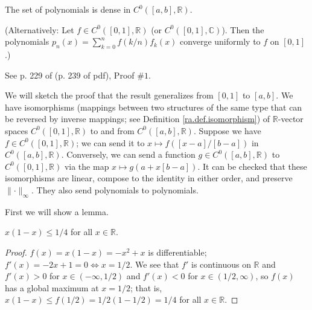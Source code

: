 \begin{theorem}\label{ra.thm.weierstrass.approx}

The set of polynomials is dense in \(C^0([a,b], \mathbb{R})\).

(Alternatively: Let \(f \in C^0([0,1], \mathbb{R})\) (or \(C^0([0,1], \mathbb{C})\)). Then the polynomials \(p_n(x) = \sum_{k=0}^n f(k/n) f_k(x)\) converge uniformly to \(f\) on \([0,1]\).)

\end{theorem}

\begin{remark}

See p. 229 of \citet{pugh2015real} (p. 239 of pdf), Proof \(\# 1\).

We will sketch the proof that the result generalizes from \([0,1]\) to \([a,b]\). We have isomorphisms (mappings between two structures of the same type that can be reversed by inverse mappings; see Definition \ref{ra.def.isomorphism}) of \(\mathbb{R}\)-vector spaces \(C^0([0,1],\mathbb{R}) \) to and from \(C^0([a,b],\mathbb{R})\). Suppose we have \(f \in C^0([0,1],\mathbb{R})\); we can send it to \(x \mapsto f([x-a]/[b-a])\) in  \(C^0([a,b],\mathbb{R})\). Conversely, we can send a function \(g \in C^0([a,b],\mathbb{R})\) to \(C^0([0,1],\mathbb{R}) \) via the map \(x \mapsto g(a + x[b-a])\). It can be checked that these isomorphisms are linear, compose to the identity in either order, and preserve \(\lVert \cdot \rVert_\infty\). They also send polynomials to polynomials.
%

\end{remark}

First we will show a lemma.

\begin{lemma}\label{ra.weierstrass.approx.lemma.max}

\(x(1-x) \leq 1/4\) for all \(x \in \mathbb{R}\).

\end{lemma}

\begin{proof}

\(f(x) = x(1-x) = -x^2 + x\) is differentiable; \(f'(x) = -2x + 1 =0 \iff x = 1/2\). We see that \(f'\) is continuous on \(\mathbb{R}\) and \(f'(x) > 0 \) for \(x \in (-\infty, 1/2)\) and \(f'(x) < 0 \) for \(x \in (1/2, \infty)\), so \(f(x)\) has a global maximum at \(x=1/2\); that is, \(x(1-x) \leq f(1/2) = 1/2(1-1/2) = 1/4\) for all \(x \in \mathbb{R}\).

\end{proof}

